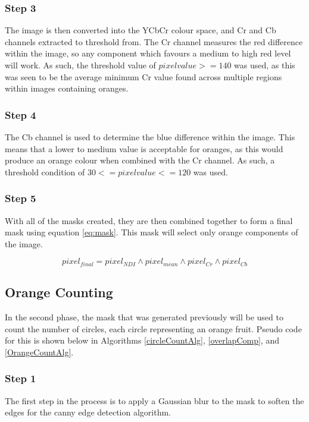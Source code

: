 \documentclass[conference]{IEEEtran}
\begin{document}
\subsubsection{Step 3}
The image is then converted into the YCbCr colour space, and Cr and Cb channels extracted to threshold from. The Cr channel measures the red difference within the image, so any component which favours a medium to high red level will work. As such, the threshold value of $pixelvalue >= 140$ was  used, as this was seen to be the average minimum Cr value found across multiple regions within images containing oranges.

\subsubsection{Step 4}

The Cb channel is used to determine the blue difference within the image. This means that a lower to medium value is acceptable for oranges, as this would produce an orange colour when combined with the Cr channel. As such, a threshold condition of $30 <= pixelvalue <= 120$ was used.

\subsubsection{Step 5}

With all of the masks created, they are then combined together to form a final mask using equation \ref{eq:mask}. This mask will select only orange components of the image.

\begin{equation} \label{eq:mask}
pixel_{final}=pixel_{NDI} \land pixel_{mean} \land pixel_{Cr} \land pixel_{Cb} 
\end{equation}

\subsection{Orange Counting} 

In the second phase, the mask that was generated previously will be used to count the number of circles, each circle representing an orange fruit. Pseudo code for this is shown below in Algorithms \ref{circleCountAlg}, \ref{overlapComp}, and \ref{OrangeCountAlg}. 

\subsubsection{Step 1}
The first step in the process is to apply a Gaussian blur to the mask to soften the edges for the canny edge detection algorithm. 
\end{document}
